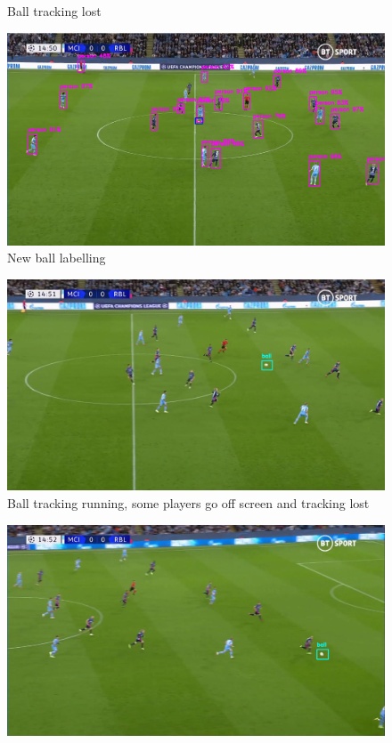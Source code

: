 \documentclass[
    11pt,
    oneside
]{report}
\begin{document}
\begin{appendices}
\begin{figure}[H]
    \caption{Ball tracking lost}
    \label{img:5}
\end{figure}
\begin{figure}[H]
    \includegraphics[keepaspectratio, width=\columnwidth]{Screenshot_2022-03-03_21-36-47.png}
    \caption{New ball labelling}
    \label{img:6}
\end{figure}
\begin{figure}[H]
    \includegraphics[keepaspectratio, width=\columnwidth]{Screenshot_2022-03-03_23-05-49.png}
    \caption{Ball tracking running, some players go off screen and tracking lost}
    \label{img:7}
\end{figure}
\begin{figure}[H]
    \includegraphics[keepaspectratio, width=\columnwidth]{Screenshot_2022-03-03_23-06-03.png}

\end{figure}
\end{appendices}
\end{document}
